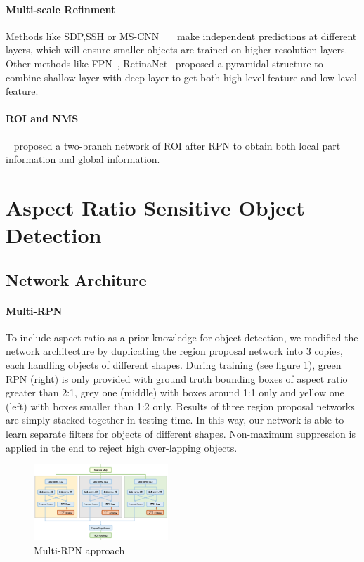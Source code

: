 \documentclass[10pt,twocolumn,letterpaper]{article}
\begin{document}
\paragraph{Multi-scale Refinment}
Methods like SDP,SSH or MS-CNN ~\cite{SDP}~\cite{SSH}~\cite{MSCNN}make independent predictions at different layers, which will ensure smaller objects are trained on higher resolution layers. Other methods like FPN~\cite{FPN}, RetinaNet~\cite{RetinaNet} proposed a pyramidal structure to combine shallow layer with deep layer to get both high-level feature and low-level feature.
\paragraph{ROI and NMS}
~\citet{CoupleNet} proposed a two-branch network of ROI after RPN to obtain both local part information and global information.

\section{Aspect Ratio Sensitive Object Detection}

\subsection{Network Architure}
\paragraph{Multi-RPN}
To include aspect ratio as a prior knowledge for object detection, we modified the network architecture by duplicating the region proposal network into 3 copies, each handling objects of different shapes. During training (see figure \ref{ARS_De}), green RPN (right) is only provided with ground truth bounding boxes of aspect ratio greater than 2:1, grey one (middle) with boxes around 1:1 only and yellow one (left) with boxes smaller than 1:2 only. Results of three region proposal networks are simply stacked together in testing time. In this way, our network is able to learn separate filters for objects of different shapes. Non-maximum suppression is applied in the end to reject high over-lapping objects. 
    \begin{figure}[!htb]
    \includegraphics[width= 0.45\textwidth]{pic/ARS-archi-detail.png}
    \caption{Multi-RPN approach}
    \label{ARS_De}
    \end{figure}
\end{document}
